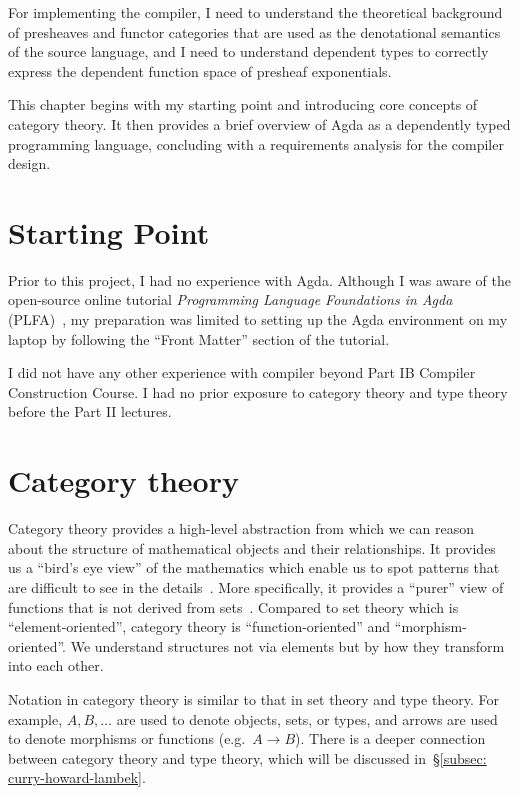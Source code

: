 \documentclass[12pt,a4paper]{report}
\theoremstyle{definition}
\newcommand{\secref}[1]{\S\ref{#1}}
\begin{document}
    For implementing the compiler, I need to understand the theoretical background of presheaves and functor categories that are used as the denotational semantics of the source language, and I need to understand dependent types to correctly express the dependent function space of presheaf exponentials. 
    
    This chapter begins with my starting point and introducing core concepts of category theory. It then provides a brief overview of Agda as a dependently typed programming language, concluding with a requirements analysis for the compiler design.

    \section{Starting Point}
    Prior to this project, I had no experience with Agda. Although I was aware of the open-source online tutorial \textit{Programming Language Foundations in Agda} (PLFA)~\autocite{plfa}, my preparation was limited to setting up the Agda environment on my laptop by following the ``Front Matter'' section of the tutorial.

    I did not have any other experience with compiler beyond Part IB Compiler Construction Course. I had no prior exposure to category theory and type theory before the Part II lectures.


    \section{Category theory} \label{sec: cat}
        Category theory provides a high-level abstraction from which we can reason about the structure of mathematical objects and their relationships. It provides us a ``bird's eye view'' of the mathematics which enable us to spot patterns that are difficult to see in the details~\autocite{basic_cat}. More specifically, it provides a ``purer'' view of functions that is not derived from sets~\autocite{scott-lambda}. Compared to set theory which is ``element-oriented'', category theory is ``function-oriented'' and ``morphism-oriented''. We understand structures not via elements but by how they transform into each other. 

        Notation in category theory is similar to that in set theory and type theory. For example, $A, B, \dots$ are used to denote objects, sets, or types, and arrows are used to denote morphisms or functions (e.g.\ $A \to B$). There is a deeper connection between category theory and type theory, which will be discussed in~\secref{subsec: curry-howard-lambek}. 
\end{document}

